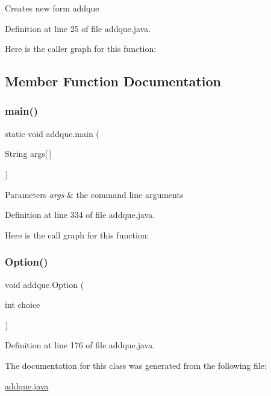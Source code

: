 Creates new form addque 

Definition at line 25 of file addque.\+java.

Here is the caller graph for this function\+:


\subsection{Member Function Documentation}
\mbox{\label{classaddque_aa49caf623e6cc51905a1d59c45a60c32}} 
\subsubsection{\texorpdfstring{main()}{main()}}
{\footnotesize\ttfamily static void addque.\+main (\begin{DoxyParamCaption}\item[{String}]{args\mbox{[}$\,$\mbox{]} }\end{DoxyParamCaption})\hspace{0.3cm}{\ttfamily [static]}}


\begin{DoxyParams}{Parameters}
{\em args} & the command line arguments \\
\hline
\end{DoxyParams}


Definition at line 334 of file addque.\+java.

Here is the call graph for this function\+:
\mbox{\label{classaddque_a8e1e059025f2ecdf4b6672b50bcb2370}} 
\subsubsection{\texorpdfstring{Option()}{Option()}}
{\footnotesize\ttfamily void addque.\+Option (\begin{DoxyParamCaption}\item[{int}]{choice }\end{DoxyParamCaption})}



Definition at line 176 of file addque.\+java.



The documentation for this class was generated from the following file\+:\begin{DoxyCompactItemize}
\item 
\mbox{\hyperlink{addque_8java}{addque.\+java}}\end{DoxyCompactItemize}
